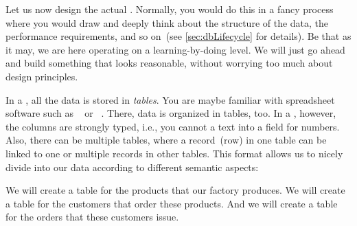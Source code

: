 %
%
\label{sec:factoryCreatingTableAndInsertingData}%
%
Let us now design the actual \db.
Normally, you would do this in a fancy process where you would draw  and deeply think about the structure of the data, the performance requirements, and so on~(see \cref{sec:dbLifecycle} for details).
Be that as it may, we are here operating on a learning-by-doing level.
We will just go ahead and build something that looks reasonable, without worrying too much about design principles.

In a , all the data is stored in \emph{tables}.
You are maybe familiar with spreadsheet software such as \microsoftExcel~\cite{P2020MSS2ABG,A2024TSAFMSS2,W2018MSSDB} or \libreofficeCalc~\cite{DF2024LTDF,GL2012LTSOOSSCBAFACSOL,S2022L7PFEUU}.
There, data is organized in tables, too.
In a , however, the columns are strongly typed, i.e., you cannot  a text into a field for numbers.
Also, there can be multiple tables, where a record~(row) in one table can be linked to one or multiple records in other tables.
This format allows us to nicely divide into our data according to different semantic aspects:

We will create a table for the products that our factory produces.
We will create a table for the customers that order these products.
And we will create a table for the orders that these customers issue.%
%
%
%
%
\endhsection%
%
